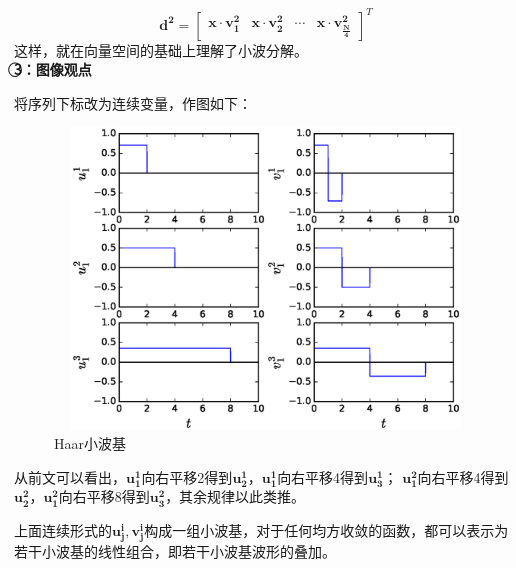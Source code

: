 \documentclass{article}
\begin{document}
\begin{CJK}{UTF8}{gbsn}
	$$\boldsymbol{d^2}=\begin{bmatrix}\boldsymbol{x}\cdot\boldsymbol{v^2_1}&\boldsymbol{x}\cdot\boldsymbol{v^2_2}&\cdots&\boldsymbol{x}\cdot\boldsymbol{v^2_{\frac{N}{4}}}\end{bmatrix}^T$$
	这样，就在向量空间的基础上理解了小波分解。\\	
	\textbf{\textcircled{3}：图像观点}\par
	将序列下标改为连续变量，作图如下：
\begin{figure}[H]
\centering
\includegraphics[height=8cm,width=12cm]{fig4.eps}
\caption{Haar小波基}
\label{4}
\end{figure}
	从前文可以看出，$\boldsymbol{u^1_1}$向右平移2得到$\boldsymbol{u^1_2}$，$\boldsymbol{u^1_1}$向右平移4得到$\boldsymbol{u^1_3}$；
	$\boldsymbol{u^2_1}$向右平移4得到$\boldsymbol{u^2_2}$，$\boldsymbol{u^2_1}$向右平移8得到$\boldsymbol{u^2_3}$，其余规律以此类推。\par
	上面连续形式的$\boldsymbol{u^i_j},\boldsymbol{v^i_j}$构成一组小波基，对于任何均方收敛的函数，都可以表示为若干小波基的线性组合，即若干小波基波形的叠加。\\
	


\end{CJK}
\end{document}

